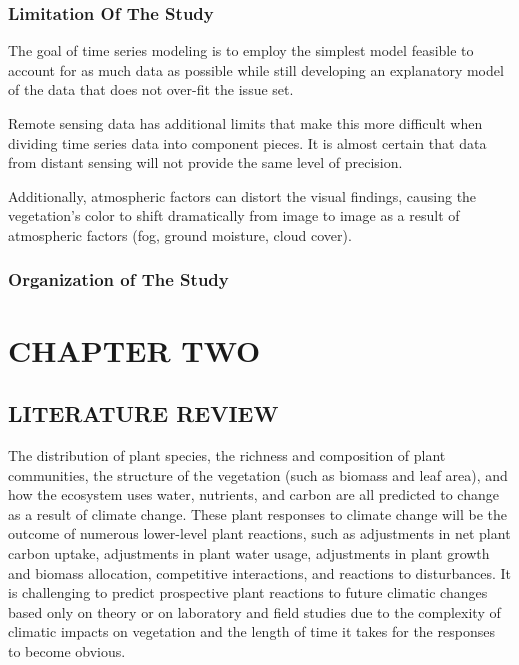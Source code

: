 \documentclass[12pt,a4paper]{book}
\begin{document}
{\hypertarget{limitation-of-the-study}{%
\subsection{Limitation Of The Study}\label{limitation-of-the-study}}

The goal of time series modeling is to employ the simplest model
feasible to account for as much data as possible while still developing
an explanatory model of the data that does not over-fit the issue set.

Remote sensing data has additional limits that make this more difficult
when dividing time series data into component pieces. It is almost
certain that data from distant sensing will not provide the same level
of precision.

Additionally, atmospheric factors can distort the visual findings,
causing the vegetation's color to shift dramatically from image to image
as a result of atmospheric factors (fog, ground moisture, cloud cover).

\hypertarget{organization-of-the-study}{%
\subsection{Organization of The Study}\label{organization-of-the-study}}

\hypertarget{chapter-two}{%
\chapter{CHAPTER TWO}\label{chapter-two}}

\hypertarget{literature-review}{%
\section{LITERATURE REVIEW}\label{literature-review}}

The distribution of plant species, the richness and composition of plant
communities, the structure of the vegetation (such as biomass and leaf
area), and how the ecosystem uses water, nutrients, and carbon are all
predicted to change as a result of climate change. These plant responses
to climate change will be the outcome of numerous lower-level plant
reactions, such as adjustments in net plant carbon uptake, adjustments
in plant water usage, adjustments in plant growth and biomass
allocation, competitive interactions, and reactions to disturbances. It
is challenging to predict prospective plant reactions to future climatic
changes based only on theory or on laboratory and field studies due to
the complexity of climatic impacts on vegetation and the length of time
it takes for the responses to become obvious.

}
\end{document}

